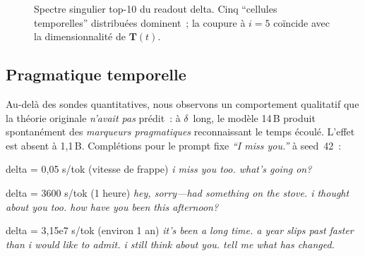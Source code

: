 \documentclass[10pt,twocolumn,letterpaper]{article}
\begin{document}
\begin{figure}[H]
\centering
{}
\caption{Spectre singulier top-10 du readout delta. Cinq ``cellules temporelles'' distribuées dominent~; la coupure à $i=5$ coïncide avec la dimensionnalité de $\mathbf{T}(t)$.}
\label{fig:svd}
\end{figure}

\subsection{Pragmatique temporelle}

Au-delà des sondes quantitatives, nous observons un comportement qualitatif que la théorie originale \emph{n'avait pas} prédit~: à $\delta$~long, le modèle 14\,B produit spontanément des \emph{marqueurs pragmatiques} reconnaissant le temps écoulé. L'effet est absent à 1{,}1\,B. Complétions pour le prompt fixe \emph{``I miss you.''} à seed~42~:

\begin{pragbox}{{delta = 0,05 s/tok (vitesse de frappe)}}
\small\itshape
i miss you too. what's going on?
\end{pragbox}
\begin{pragbox}{delta = 3600 s/tok (1 heure)}
\small\itshape
hey, sorry---had something on the stove. i thought about you too. how have you been this afternoon?
\end{pragbox}
\begin{pragbox}{{delta = 3,15e7 s/tok (environ 1 an)}}
\small\itshape
it's been a long time. a year slips past faster than i would like to admit. i still think about you. tell me what has changed.
\end{pragbox}
\end{document}
